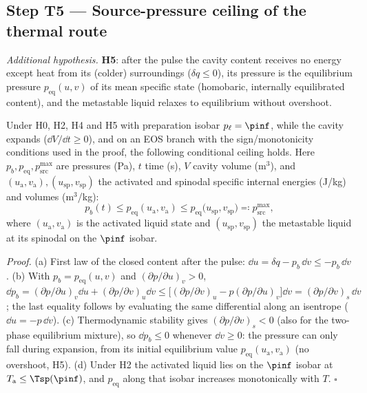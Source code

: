 \subsection{Step T5 --- Source-pressure ceiling of the thermal route}\label{sec:psrc}
\emph{Additional hypothesis.} \textbf{H5}: after the pulse the cavity content receives no energy except heat
from its (colder) surroundings ($\delta q\le0$), its pressure is the equilibrium pressure $p_{\mathrm{eq}}(u,v)$ of
its mean specific state (homobaric, internally equilibrated content), and the metastable liquid relaxes to
equilibrium without overshoot.
\begin{proposition}\label{prop:psrc}
Under H0, H2, H4 and H5 with preparation isobar $p_\ell=\pinf$, while the cavity expands
($\dd V/\dd t\ge0$), and on an EOS branch
with the sign/monotonicity conditions used in the proof, the following conditional ceiling holds.
Here $p_b,p_{\mathrm{eq}},p_{\mathrm{src}}^{\max}$ are pressures (Pa), $t$ time (s), $V$ cavity
volume (m$^3$), and $(u_{\mathrm a},v_{\mathrm a}),(u_{\mathrm{sp}},v_{\mathrm{sp}})$ the activated and
spinodal specific internal energies (J/kg) and volumes (m$^3$/kg):
\begin{equation}
p_b(t)\le p_{\mathrm{eq}}(u_{\mathrm a},v_{\mathrm a})\le p_{\mathrm{eq}}\bigl(u_{\mathrm{sp}},v_{\mathrm{sp}}\bigr)\eqqcolon p_{\mathrm{src}}^{\max},\label{eq:psrc}
\end{equation}
where $(u_{\mathrm a},v_{\mathrm a})$ is the activated liquid state and $(u_{\mathrm{sp}},v_{\mathrm{sp}})$ the metastable liquid at
its spinodal on the $\pinf$ isobar.
\end{proposition}
\emph{Proof.} (a) First law of the closed content after the pulse: $\dd u=\delta q-p_b\,\dd v\le-p_b\,\dd v$.
(b) With $p_b=p_{\mathrm{eq}}(u,v)$ and $(\partial p/\partial u)_v>0$,
$\dd p_b=(\partial p/\partial u)_v\dd u+(\partial p/\partial v)_u\dd v\le\bigl[(\partial p/\partial v)_u-p(\partial p/\partial u)_v\bigr]\dd v
=(\partial p/\partial v)_s\,\dd v$; the last equality follows by evaluating the same differential along an isentrope
($\dd u=-p\,\dd v$). (c) Thermodynamic stability gives $(\partial p/\partial v)_s<0$ (also for the two-phase equilibrium
mixture), so $\dd p_b\le0$ whenever $\dd v\ge0$: the pressure can only fall during expansion, from its initial
equilibrium value $p_{\mathrm{eq}}(u_{\mathrm a},v_{\mathrm a})$ (no overshoot, H5). (d) Under H2 the activated liquid lies on the
$\pinf$ isobar at $T_{\mathrm a}\le\Tsp(\pinf)$, and $p_{\mathrm{eq}}$ along that isobar increases monotonically with
$T$. $\square$

